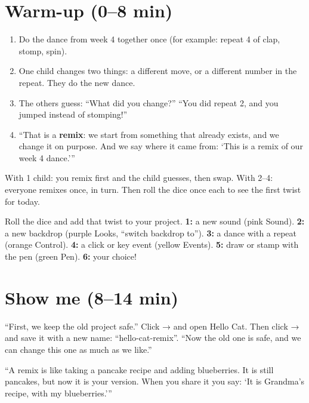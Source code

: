 \section{Warm-up (0--8 min)}
\begin{unplugged}
\begin{enumerate}[leftmargin=1.4em,itemsep=1pt]
  \item Do the dance from week 4 together once (for example: repeat 4 of clap, stomp, spin).
  \item One child changes two things: a different move, or a different number in the repeat. They do the new dance.
  \item The others guess: \enquote{What did you change?} \enquote{You did repeat 2, and you jumped instead of stomping!}
  \item \enquote{That is a \textbf{remix}: we start from something that already exists, and we change it on purpose. And we say where it came from: \enquote{This is a remix of our week 4 dance.}}
\end{enumerate}
With 1 child: you remix first and the child guesses, then swap. With 2--4: everyone remixes once, in turn. Then roll the dice once each to see the first twist for today.
\end{unplugged}

\begin{tip}
Roll the dice and add that twist to your project.
\textbf{1:} a new sound (pink Sound). \textbf{2:} a new backdrop (purple Looks, \enquote{switch backdrop to}). \textbf{3:} a dance with a repeat (orange Control). \textbf{4:} a click or key event (yellow Events). \textbf{5:} draw or stamp with the pen (green Pen). \textbf{6:} your choice!
\end{tip}

\section{Show me (8--14 min)}
\begin{teacherscript}
\enquote{First, we keep the old project safe.} Click  →  and open Hello Cat. Then click  →  and save it with a new name: \enquote{hello-cat-remix}. \enquote{Now the old one is safe, and we can change this one as much as we like.}
\end{teacherscript}

\begin{analogy}
\enquote{A remix is like taking a pancake recipe and adding blueberries. It is still pancakes, but now it is your version. When you share it you say: \enquote{It is Grandma's recipe, with my blueberries.}}
\end{analogy}

